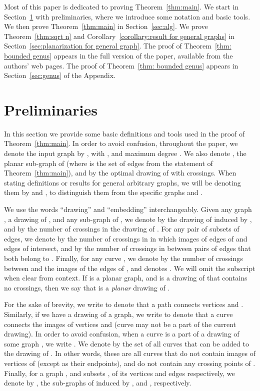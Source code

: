 \documentclass[twoside,leqno,twocolumn]{article}
\begin{document}
 Most of this paper is dedicated to proving Theorem~\ref{thm:main}. We start in Section~\ref{sec:prelims} with preliminaries, where we introduce some notation and basic tools. We then prove Theorem~\ref{thm:main} in Section~\ref{sec:alg}. We prove Theorem~\ref{thm:sqrt n} and Corollary~\ref{corollary:result for general graphs} in Section~\ref{sec:planarization for general graph}. 
\ifabstract
The proof of Theorem~\ref{thm: bounded genus} appears in the full version of the paper, available from the authors' web pages.
\fi
\iffull 
The proof of Theorem~\ref{thm: bounded genus} appears in Section~\ref{sec:genus} of the Appendix.
\fi

\section{Preliminaries}\label{sec:prelims}
In this section we provide some basic definitions and tools used in the proof of Theorem~\ref{thm:main}. In order to avoid confusion, throughout the paper, we denote the input graph by , with , and maximum degree . We also denote , the planar sub-graph of  (where  is the set of edges from the statement of Theorem~\ref{thm:main}), and by  the optimal drawing of  with  crossings. When stating definitions or results for general arbitrary graphs, we will be denoting them by  and , to distinguish them from the specific graphs  and . 

We use the words ``drawing'' and ``embedding'' interchangeably. 
Given any graph , a drawing  of , and any sub-graph  of , we denote by  the drawing of  induced by , and by  the number of crossings in the drawing  of . For any pair  of subsets of edges, we denote by  the number of crossings in  in which images of edges of  and edges of  intersect, and by  the number of crossings in  between pairs of edges that both belong to . Finally, for any curve , we denote by  the number of crossings between  and the images of the edges of , and  denotes . We will omit the subscript  when clear from context.
If  is a planar graph, and  is a drawing of  that contains no crossings, then we say that  is a \emph{planar} drawing of .


For the sake of brevity, we write  to denote that a path  connects vertices  and . Similarly, if we have a drawing of a graph, we write  to denote that a curve  connects the images of vertices  and  (curve  may not be a part of the current drawing). 
In order to avoid confusion, when a curve  is a part of a drawing  of some graph , we write . We denote by  the set of all curves that can be added to the drawing  of . In other words, these are all curves that do not contain images of vertices of  (except as their endpoints), and do not contain any crossing points of .
Finally, for a graph , and subsets ,  of its vertices and edges respectively, we denote by ,  the sub-graphs of  induced by , and , respectively.
\end{document}
